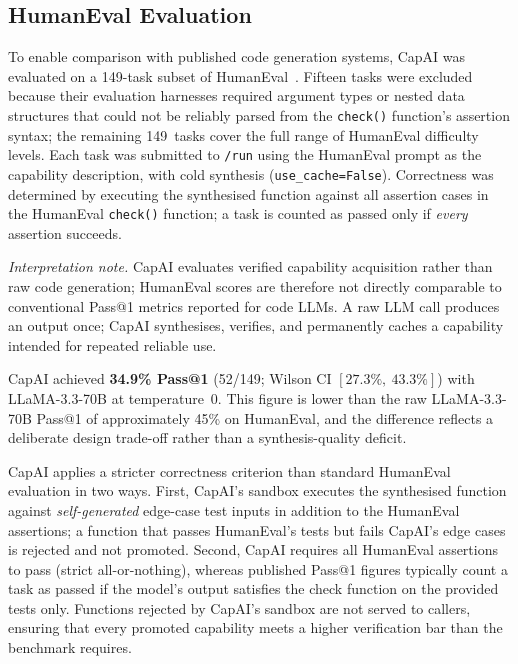 \documentclass[conference]{IEEEtran}
\begin{document}
\subsection{HumanEval Evaluation}
\label{subsec:humaneval}

To enable comparison with published code generation systems, CapAI was
evaluated on a 149-task subset of HumanEval~\cite{chen2021humaneval}.
Fifteen tasks were excluded because their evaluation harnesses required
argument types or nested data structures that could not be reliably
parsed from the \texttt{check()} function's assertion syntax; the
remaining 149~tasks cover the full range of HumanEval difficulty levels.
Each task was submitted to \texttt{/run} using the HumanEval prompt as
the capability description, with cold synthesis (\texttt{use\_cache=False}).
Correctness was determined by executing the synthesised function against
all assertion cases in the HumanEval \texttt{check()} function; a task
is counted as passed only if \emph{every} assertion succeeds.

\textit{Interpretation note.} CapAI evaluates verified capability
acquisition rather than raw code generation; HumanEval scores are
therefore not directly comparable to conventional Pass@1 metrics reported
for code LLMs.
A raw LLM call produces an output once; CapAI synthesises, verifies,
and permanently caches a capability intended for repeated reliable use.

CapAI achieved \textbf{34.9\% Pass@1} (52/149; Wilson CI
$[27.3\%,\ 43.3\%]$) with LLaMA-3.3-70B at temperature~0.
This figure is lower than the raw LLaMA-3.3-70B Pass@1 of approximately
45\% on HumanEval, and the difference reflects a deliberate design
trade-off rather than a synthesis-quality deficit.

CapAI applies a stricter correctness criterion than standard HumanEval
evaluation in two ways.
First, CapAI's sandbox executes the synthesised function against
\emph{self-generated} edge-case test inputs in addition to the
HumanEval assertions; a function that passes HumanEval's tests but
fails CapAI's edge cases is rejected and not promoted.
Second, CapAI requires all HumanEval assertions to pass (strict
all-or-nothing), whereas published Pass@1 figures typically count
a task as passed if the model's output satisfies the check function
on the provided tests only.
Functions rejected by CapAI's sandbox are not served to callers,
ensuring that every promoted capability meets a higher verification
bar than the benchmark requires.
\end{document}
